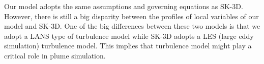 \documentclass[journal abbreviation, manuscript]{copernicus}
\begin{document}
Our model adopts the same assumptions and governing equations as SK-3D. However, there is still a big disparity between the profiles of local variables of our model and SK-3D. One of the big differences between these two models is that we adopt a LANS type of turbulence model while SK-3D adopts a LES (large eddy simulation) turbulence model. This implies that turbulence model might play a critical role in plume simulation.

%
%
%
\end{document}
